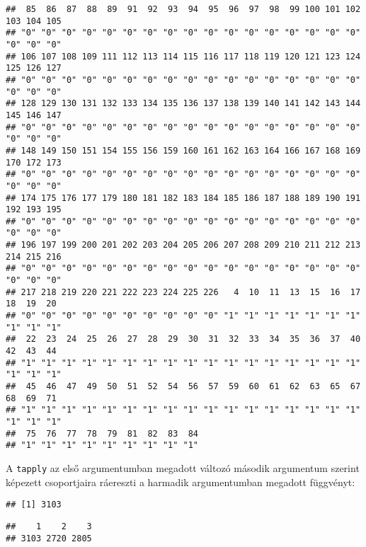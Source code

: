 \documentclass[
]{book}
\newenvironment{Shaded}{\begin{snugshade}}{\end{snugshade}}
\newcommand{\DecValTok}[1]{\textcolor[rgb]{0.00,0.00,0.81}{#1}}
\newcommand{\KeywordTok}[1]{\textcolor[rgb]{0.13,0.29,0.53}{\textbf{#1}}}
\newcommand{\NormalTok}[1]{#1}
\newcommand{\OperatorTok}[1]{\textcolor[rgb]{0.81,0.36,0.00}{\textbf{#1}}}
\newcommand{\StringTok}[1]{\textcolor[rgb]{0.31,0.60,0.02}{#1}}
\begin{document}
\begin{verbatim}
##  85  86  87  88  89  91  92  93  94  95  96  97  98  99 100 101 102 103 104 105 
## "0" "0" "0" "0" "0" "0" "0" "0" "0" "0" "0" "0" "0" "0" "0" "0" "0" "0" "0" "0" 
## 106 107 108 109 111 112 113 114 115 116 117 118 119 120 121 123 124 125 126 127 
## "0" "0" "0" "0" "0" "0" "0" "0" "0" "0" "0" "0" "0" "0" "0" "0" "0" "0" "0" "0" 
## 128 129 130 131 132 133 134 135 136 137 138 139 140 141 142 143 144 145 146 147 
## "0" "0" "0" "0" "0" "0" "0" "0" "0" "0" "0" "0" "0" "0" "0" "0" "0" "0" "0" "0" 
## 148 149 150 151 154 155 156 159 160 161 162 163 164 166 167 168 169 170 172 173 
## "0" "0" "0" "0" "0" "0" "0" "0" "0" "0" "0" "0" "0" "0" "0" "0" "0" "0" "0" "0" 
## 174 175 176 177 179 180 181 182 183 184 185 186 187 188 189 190 191 192 193 195 
## "0" "0" "0" "0" "0" "0" "0" "0" "0" "0" "0" "0" "0" "0" "0" "0" "0" "0" "0" "0" 
## 196 197 199 200 201 202 203 204 205 206 207 208 209 210 211 212 213 214 215 216 
## "0" "0" "0" "0" "0" "0" "0" "0" "0" "0" "0" "0" "0" "0" "0" "0" "0" "0" "0" "0" 
## 217 218 219 220 221 222 223 224 225 226   4  10  11  13  15  16  17  18  19  20 
## "0" "0" "0" "0" "0" "0" "0" "0" "0" "0" "1" "1" "1" "1" "1" "1" "1" "1" "1" "1" 
##  22  23  24  25  26  27  28  29  30  31  32  33  34  35  36  37  40  42  43  44 
## "1" "1" "1" "1" "1" "1" "1" "1" "1" "1" "1" "1" "1" "1" "1" "1" "1" "1" "1" "1" 
##  45  46  47  49  50  51  52  54  56  57  59  60  61  62  63  65  67  68  69  71 
## "1" "1" "1" "1" "1" "1" "1" "1" "1" "1" "1" "1" "1" "1" "1" "1" "1" "1" "1" "1" 
##  75  76  77  78  79  81  82  83  84 
## "1" "1" "1" "1" "1" "1" "1" "1" "1"
\end{verbatim}

A \texttt{tapply} az első argumentumban megadott változó második argumentum szerint képezett csoportjaira ráereszti a harmadik argumentumban megadott függvényt:

\begin{Shaded}
\end{Shaded}

\begin{verbatim}
## [1] 3103
\end{verbatim}

\begin{Shaded}
\end{Shaded}

\begin{verbatim}
##    1    2    3 
## 3103 2720 2805
\end{verbatim}

\backmatter
\end{document}
